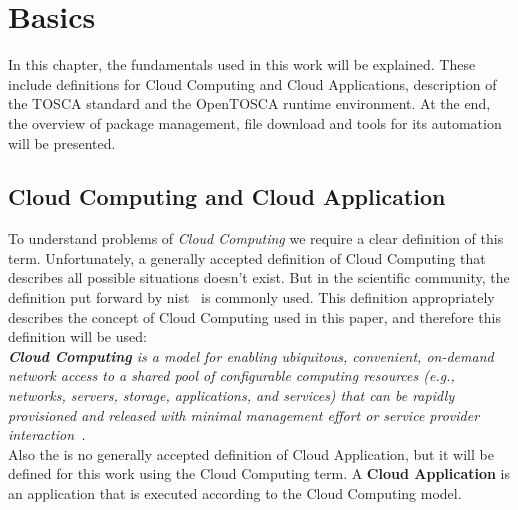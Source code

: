 
\chapter{Basics}
\label{chap:basis}
In this chapter, the fundamentals used in this work will be explained.
These include definitions for Cloud Computing and Cloud Applications, description of the TOSCA standard and the OpenTOSCA runtime environment.
At the end, the overview of package management, file download and tools for its automation will be presented.
\section{Cloud Computing and Cloud Application} \label{sec:cloud}
To understand problems of \emph{Cloud Computing} we require a clear definition of this term.
Unfortunately, a generally accepted definition of Cloud Computing that describes all possible situations doesn't exist. 
But in the scientific community, the definition put forward by \gls{nist}~\cite*{wwwnist} is commonly used. 
This definition appropriately describes the concept of Cloud Computing used in this paper, and therefore this definition will be used:\\
\emph{\textbf{Cloud Computing}\label{def:nist} is a model for enabling ubiquitous, convenient, on-demand network access to a shared pool of configurable computing resources (e.g., networks, servers, storage, applications, and services) that can be rapidly provisioned and released with minimal management effort or service provider interaction~\cite*{nist}.}\\
Also the is no generally accepted definition of Cloud Application, but it will be defined for this work using the Cloud Computing term.
A \textbf{Cloud Application}\label{def:capp} is an application that is executed according to the Cloud Computing model. %
